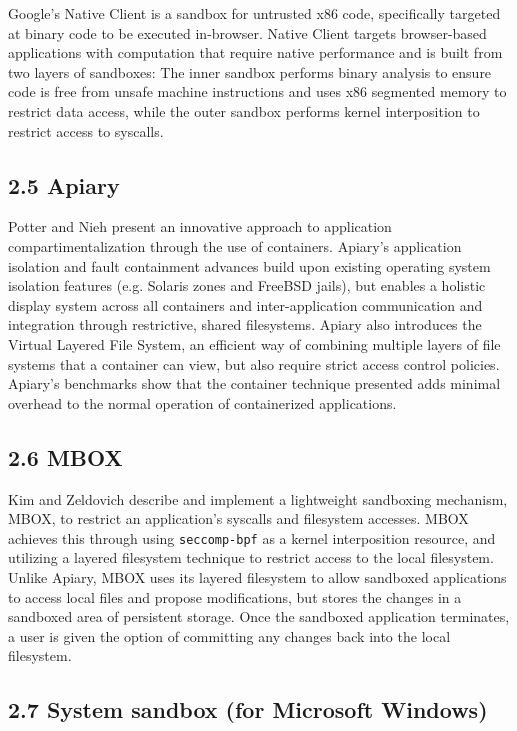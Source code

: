 \documentclass{proc}
\begin{document}
Google's Native Client \cite{yee2009native} is a sandbox for untrusted x86 code, specifically targeted at binary code to be executed in-browser. Native Client targets browser-based applications with computation that require native performance and is built from two layers of sandboxes: The inner sandbox performs binary analysis to ensure code is free from unsafe machine instructions and uses x86 segmented memory to restrict data access, while the outer sandbox performs kernel interposition to restrict access to syscalls.

\subsection*{2.5 Apiary}

Potter and Nieh \cite{potter2010apiary} present an innovative approach to application compartimentalization through the use of containers. Apiary's application isolation and fault containment advances build upon existing operating system isolation features (e.g. Solaris zones and FreeBSD jails), but enables a holistic display system across all containers and inter-application communication and integration through restrictive, shared filesystems. Apiary also introduces the Virtual Layered File System, an efficient way of combining multiple layers of file systems that a container can view, but also require strict access control policies. Apiary's benchmarks show that the container technique presented adds minimal overhead to the normal operation of containerized applications.

\subsection*{2.6 MBOX}

Kim and Zeldovich \cite{kim2013mbox} describe and implement a lightweight sandboxing mechanism, MBOX, to restrict an application's syscalls and filesystem accesses. MBOX achieves this through using \texttt{seccomp-bpf} as a kernel interposition resource, and utilizing a layered filesystem technique to restrict access to the local filesystem. Unlike Apiary, MBOX uses its layered filesystem to allow sandboxed applications to access local files and propose modifications, but stores the changes in a sandboxed area of persistent storage. Once the sandboxed application terminates, a user is given the option of committing any changes back into the local filesystem.

\subsection*{2.7 System sandbox (for Microsoft Windows)}
\end{document}
